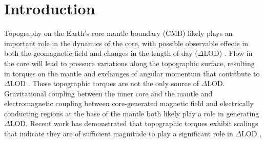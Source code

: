
\section{Introduction}


Topography on the Earth's core mantle boundary (CMB) likely plays an important role in the dynamics of the core, with possible observable effects in both the geomagnetic field \citep{aA77} and changes in the length of day ($\Delta$LOD) \citep{dJ89,HdV05,pR12,sR23,fM25}. 
Flow in the core will lead to pressure variations along the topographic surface, resulting in torques on the mantle and exchanges of angular momentum that contribute to $\Delta$LOD \citep{wK97,pR12}. 
These topographic torques are not the only source of $\Delta$LOD. Gravitational coupling between the inner core and the mantle \citep{bB96,jM03} and electromagnetic coupling between core-generated magnetic field and electrically conducting regions at the base of the mantle \citep{bB07,sB70, dJ15,wK19} both likely play a role in generating $\Delta$LOD. 
Recent work has demonstrated that topographic torques exhibit scalings that indicate they are of sufficient magnitude to play a significant role in $\Delta$LOD \citep{tO25}, 
